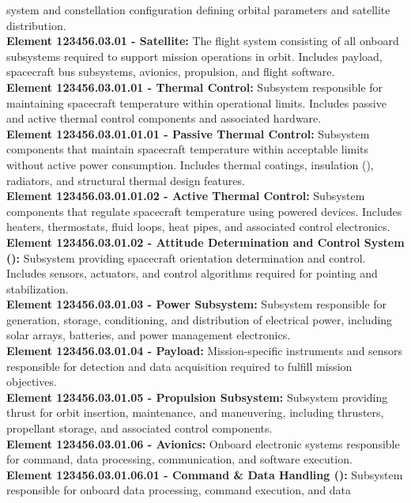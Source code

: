 system and constellation configuration defining orbital parameters and satellite
distribution.\\
\textbf{Element 123456.03.01 - Satellite:} The flight system consisting of all onboard
subsystems required to support mission operations in orbit. Includes payload,
spacecraft bus subsystems, avionics, propulsion, and flight software.\\
\textbf{Element 123456.03.01.01 - Thermal Control:} Subsystem responsible for maintaining
spacecraft temperature within operational limits. Includes passive and active thermal
control components and associated hardware.\\
\textbf{Element 123456.03.01.01.01 - Passive Thermal Control:} Subsystem components
that maintain spacecraft temperature within acceptable limits without active power
consumption. Includes thermal coatings, insulation (), radiators, and structural
thermal design features.\\
\textbf{Element 123456.03.01.01.02 - Active Thermal Control:} Subsystem components that
regulate spacecraft temperature using powered devices. Includes heaters,
thermostats, fluid loops, heat pipes, and associated control electronics.\\
\textbf{Element 123456.03.01.02 - Attitude Determination and Control System ():}
Subsystem providing spacecraft orientation determination and control. Includes
sensors, actuators, and control algorithms required for pointing and stabilization.\\
\textbf{Element 123456.03.01.03 - Power Subsystem:} Subsystem responsible for
generation, storage, conditioning, and distribution of electrical power, including solar
arrays, batteries, and power management electronics.\\
\textbf{Element 123456.03.01.04 - Payload:} Mission-specific instruments and sensors
responsible for detection and data acquisition required to fulfill mission objectives.\\
\textbf{Element 123456.03.01.05 - Propulsion Subsystem:} Subsystem providing thrust for
orbit insertion, maintenance, and maneuvering, including thrusters, propellant
storage, and associated control components.\\
\textbf{Element 123456.03.01.06 - Avionics:} Onboard electronic systems responsible for
command, data processing, communication, and software execution.\\
\textbf{Element 123456.03.01.06.01 - Command \& Data Handling ():} Subsystem
responsible for onboard data processing, command execution, and data

